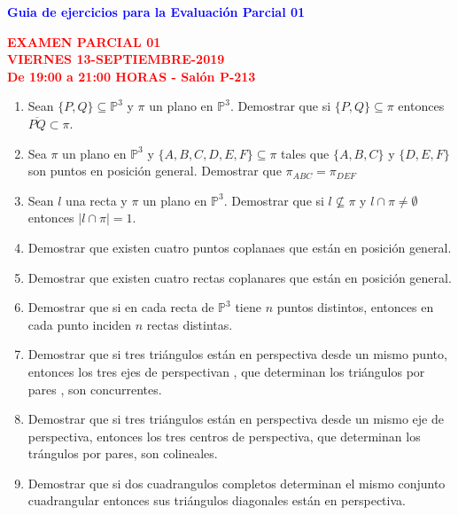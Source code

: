 \documentclass[12pts]{report}
\newcommand{\p}{\mathbb P}
\begin{document}
\begin{center}
\textcolor{blue}{\textbf{\large Guia de ejercicios para la Evaluación Parcial 01 }}\\
\vspace{0.5 cm}
\end{center}


\begin{center}
\textcolor{red}{\textbf{\large EXAMEN PARCIAL 01 \\ VIERNES
13-SEPTIEMBRE-2019\\ De 19:00 a 21:00 HORAS - Salón P-213}}
\end{center}

\begin{enumerate}
\item Sean $\{P,Q\} \subseteq \p^3$ y $\pi$ un plano en $\p^3$. Demostrar que si $\{P,Q\} \subseteq \pi$ entonces $\overline{PQ}\subset \pi$.

\item Sea $\pi$ un plano en $\p^3$ y $\{A,B,C,D,E,F\} \subseteq \pi$ tales que $\{A,B,C\}$ y $\{D,E,F\}$ son puntos en posición general. Demostrar que $\pi_{ABC}=\pi_{DEF}$

 \item Sean $l$ una recta y $\pi$ un plano en $\p^3$. Demostrar que si $l \not\subseteq \pi$ y $l \cap \pi \neq \emptyset$ entonces $|l\cap \pi|= 1$.

\item Demostrar que existen cuatro puntos coplanaes que están en posición general.

\item Demostrar que existen cuatro rectas coplanares que están en posición general.

\item Demostrar que si en cada recta de $\p^3$ tiene $n$ puntos distintos, entonces en cada punto inciden $n$ rectas distintas.

\item Demostrar que si tres triángulos están en perspectiva desde un mismo punto, entonces los tres ejes de perspectivan , que determinan los triángulos por pares , son concurrentes.

\item Demostrar que si tres triángulos están en perspectiva desde un mismo eje de perspectiva, entonces los  tres centros de perspectiva, que determinan los trángulos por pares, son colineales.

\item Demostrar que si dos cuadrangulos completos determinan el mismo conjunto cuadrangular entonces sus triángulos diagonales están en perspectiva.
\end{enumerate}
\end{document}
